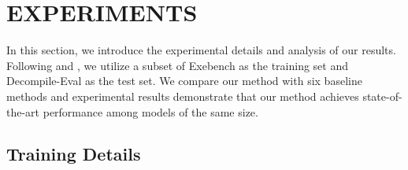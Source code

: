 



\section{EXPERIMENTS}

In this section, we introduce the experimental details and analysis of our results. 
Following \citet{llm4decompile} and \citet{feng2024self}, we utilize a subset of Exebench \citep{exebench} as the training set and Decompile-Eval \citep{llm4decompile} as the test set.
We compare our method with six baseline methods and experimental results demonstrate that our method achieves state-of-the-art performance among models of the same size.

\subsection{Training Details}


